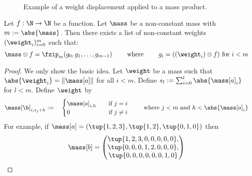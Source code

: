 \begin{example}
\begin{figure}[H]
		\caption{Example of a weight displacement applied to a mass product.}
		\label{fig:mass_prod}
	\end{figure}
\end{example}

\begin{lemma}\label{single_weight_in_mass}
	Let $f: \N \to \N$ be a function. Let $\mass$ be a non-constant mass with $m:=\abs{\mass}$. Then there exists a list of non-constant weights $(\weight_i)_{i=0}^{m}$ such that:
	\begin{align*}
		\mass \otimes f = \fzip_m(g_0,g_1,\dots, g_{m-1}) \qquad\text{ where }\qquad g_i = ((\weight_i) \otimes f) \text{ for } i<m
	\end{align*}
	\begin{proof}
		We only show the basic idea.
		Let $\weight$ be a mass such that $\abs{\weight_i} = \|\mass[a]\|$ for all $i<m$.
		Define $s_l := \sum_{i=0}^{l}\abs{\mass[a]_i}$ for $l < m$.
		Define $\weight$ by
		\begin{align*}
			\mass[\b]_{i,s_j+h} := \quad
		\begin{cases}
			\mass[a]_{i,h}\quad &\text{if } j = i \\
			0 \quad &\text{if } j \neq i
		\end{cases}
		\qquad
		\text{ where } j<m \text{ and } h<\abs{\mass[a]_i}
		\end{align*}
		For example, if $\mass[a] = (\tup{1,2,3},\tup{1,2},\tup{0,1,0})$ then
		\begin{align*}
		\mass[b] = 
		\begin{pmatrix}
			\tup{1, 2, 3, 0, 0, 0, 0, 0}, \\
			\tup{0, 0, 0, 1, 2, 0, 0, 0}, \\
			\tup{0, 0, 0, 0, 0, 0, 1, 0}
		\end{pmatrix}
		\end{align*}
	\end{proof}
\end{lemma}

